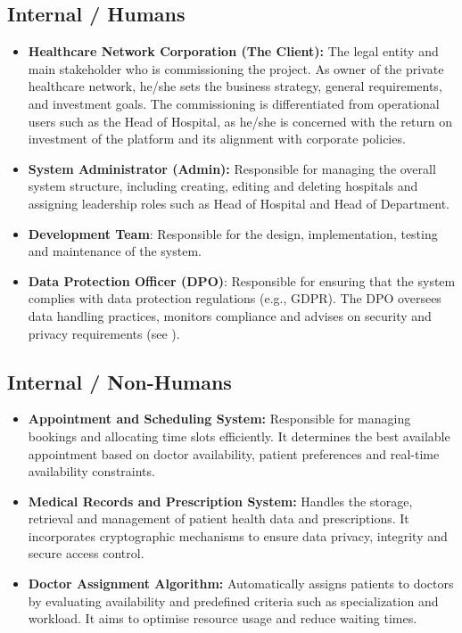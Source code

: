\documentclass[12pt, a4paper]{article}
\begin{document}
\subsection{Internal / Humans}
\begin{itemize}
    \item \textbf{Healthcare Network Corporation (The Client):} The legal entity and main stakeholder who is commissioning the project. As owner of the private healthcare network, he/she sets the business strategy, general requirements, and investment goals. The commissioning is differentiated from operational users such as the Head of Hospital, as he/she is concerned with the return on investment of the platform and its alignment with corporate policies.

    \item \textbf{System Administrator (Admin):} Responsible for managing the overall system structure, including creating, editing and deleting hospitals and assigning leadership roles such as Head of Hospital and Head of Department.

    \item \textbf{Development Team}: Responsible for the design, implementation, testing and maintenance of the system.

    \item \textbf{Data Protection Officer (DPO)}: Responsible for ensuring that the system complies with data protection regulations (e.g., GDPR). The DPO oversees data handling practices, monitors compliance and advises on security and privacy requirements (see ).
   
\end{itemize}

\subsection{Internal / Non-Humans}
\begin{itemize}
    \item \textbf{Appointment and Scheduling System:} Responsible for managing bookings and allocating time slots efficiently. It determines the best available appointment based on doctor availability, patient preferences and real-time availability constraints.

    \item \textbf{Medical Records and Prescription System:} Handles the storage, retrieval and management of patient health data and prescriptions. It incorporates cryptographic mechanisms to ensure data privacy, integrity and secure access control.

    \item \textbf{Doctor Assignment Algorithm:} Automatically assigns patients to doctors by evaluating availability and predefined criteria such as specialization and workload. It aims to optimise resource usage and reduce waiting times.
\end{itemize}
\end{document}
